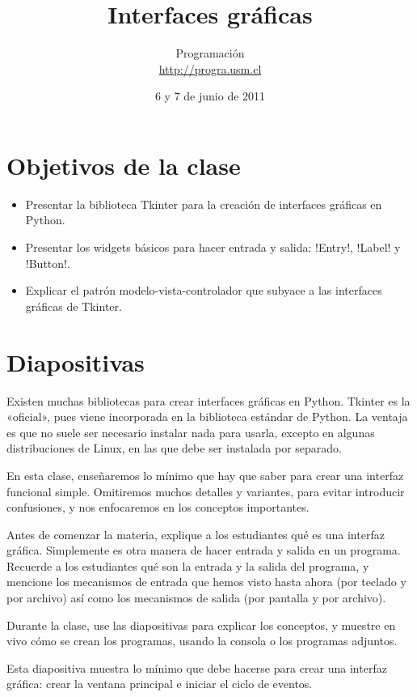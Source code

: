 \documentclass[10pt]{article}
\title{Interfaces gráficas}
\author{Programación \\ \url{http://progra.usm.cl}}
\date{6 y 7 de junio de 2011}
\begin{document}
  \maketitle

  \section*{Objetivos de la clase}
  \begin{itemize}
    \item Presentar la biblioteca Tkinter
      para la creación de interfaces gráficas en Python.
    \item Presentar los widgets básicos
      para hacer entrada y salida:
      \li!Entry!, \li!Label! y \li!Button!.
    \item Explicar el patrón modelo-vista-controlador
      que subyace a las interfaces gráficas de Tkinter.
  \end{itemize}

  \section*{Diapositivas}

  Existen muchas bibliotecas para crear interfaces gráficas en Python.
  Tkinter es la «oficial»,
  pues viene incorporada en la biblioteca estándar de Python.
  La ventaja es que no suele ser necesario instalar nada para usarla,
  excepto en algunas distribuciones de Linux, en las que debe ser instalada por separado.

  En esta clase,
  enseñaremos lo mínimo que hay que saber para crear una interfaz funcional simple.
  Omitiremos muchos detalles y variantes,
  para evitar introducir confusiones,
  y nos enfocaremos en los conceptos importantes.

  Antes de comenzar la materia,
  explique a los estudiantes qué es una interfaz gráfica.
  Simplemente es otra manera de hacer entrada y salida en un programa.
  Recuerde a los estudiantes qué son la entrada y la salida del programa,
  y mencione los mecanismos de entrada que hemos visto hasta ahora
  (por teclado y por archivo)
  así como los mecanismos de salida
  (por pantalla y por archivo).

  Durante la clase,
  use las diapositivas para explicar los conceptos,
  y muestre en vivo cómo se crean los programas,
  usando la consola o los programas adjuntos.


  Esta diapositiva muestra lo mínimo que debe hacerse
  para crear una interfaz gráfica:
  crear la ventana principal
  e iniciar el ciclo de eventos.
\end{document}
